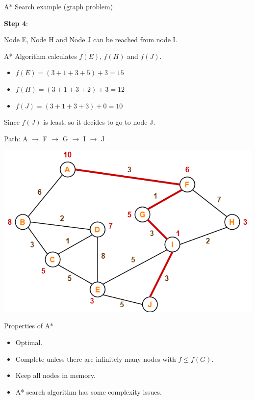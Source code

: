 \documentclass[9pt]{beamer}
\begin{document}
\begin{frame}{A* Search example (graph problem)}
\begin{small}
{\vspace{-1cm}

\textbf{Step 4}:

Node E, Node H and Node J can be reached from node I.

A* Algorithm calculates $f(E)$, $f(H)$ and $f(J)$.

\begin{itemize}
    \item $f(E) = (3+1+3+5) + 3 = 15$
    \item $f(H) = (3+1+3+2) + 3 = 12$
    \item $f(J) = (3+1+3+3) + 0 = 10$
\end{itemize}
 
Since $f(J)$ is least, so it decides to go to node J.

Path: \textcolor{CS-1}{A $\rightarrow$ F $\rightarrow$ G $\rightarrow$ I $\rightarrow$ J}
}

 {
\begin{center}
    \includegraphics[keepaspectratio, width=0.75\linewidth]{images/A-Algorithm-Problem-02-Solution.png}
\end{center}
}

\end{small}
\end{frame}

\begin{frame}{Properties of A*}
\begin{small}

\begin{itemize}
    \item Optimal.
    \item Complete unless there are infinitely many nodes with $f \leq f(G)$.
    \item Keep all nodes in memory.
    \item A* search algorithm has some complexity issues.
\end{itemize}

\end{small}
\end{frame}
\end{document}
